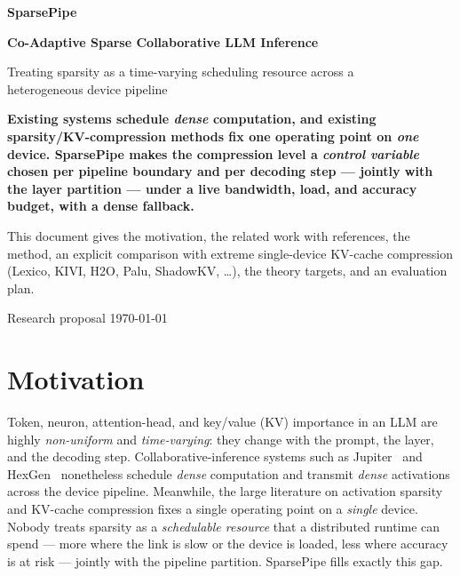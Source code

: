 \documentclass[11pt]{article}
\begin{document}
\begin{titlepage}
\centering
\vspace*{1.7cm}
{\Huge\bfseries\color{accent} SparsePipe\par}
\vspace{0.4cm}
{\Large\bfseries\color{accent} Co-Adaptive Sparse Collaborative LLM Inference\par}
\vspace{0.5cm}
{\large Treating sparsity as a time-varying scheduling resource across a\\ heterogeneous device pipeline\par}
\vspace{1.6cm}
\begin{tcolorbox}[colback=accent3!8,colframe=accent3,width=0.92\textwidth,arc=3pt]
\centering\bfseries
Existing systems schedule \emph{dense} computation, and existing sparsity/KV-compression
methods fix one operating point on \emph{one} device. SparsePipe makes the compression
level a \emph{control variable} chosen per pipeline boundary and per decoding step ---
jointly with the layer partition --- under a live bandwidth, load, and accuracy budget,
with a dense fallback.
\end{tcolorbox}
\vspace{1.2cm}
\begin{tcolorbox}[colback=softgray,colframe=accent,width=0.92\textwidth,arc=3pt]
\centering
This document gives the motivation, the related work with references, the method, an
explicit comparison with extreme single-device KV-cache compression (Lexico, KIVI, H2O,
Palu, ShadowKV, \dots), the theory targets, and an evaluation plan.
\end{tcolorbox}
\vfill
{\normalsize Research proposal \;\textbullet\; \today\par}
\end{titlepage}

\tableofcontents
\newpage

\section{Motivation}

\begin{motivebox}
Token, neuron, attention-head, and key/value (KV) importance in an LLM are highly
\emph{non-uniform} and \emph{time-varying}: they change with the prompt, the layer, and the
decoding step. Collaborative-inference systems such as Jupiter~\cite{jupiter} and
HexGen~\cite{hexgen} nonetheless schedule \emph{dense} computation and transmit \emph{dense}
activations across the device pipeline. Meanwhile, the large literature on activation
sparsity and KV-cache compression fixes a single operating point on a \emph{single} device.
Nobody treats sparsity as a \emph{schedulable resource} that a distributed runtime can spend
--- more where the link is slow or the device is loaded, less where accuracy is at
risk --- jointly with the pipeline partition. SparsePipe fills exactly this gap.
\end{motivebox}
\end{document}
